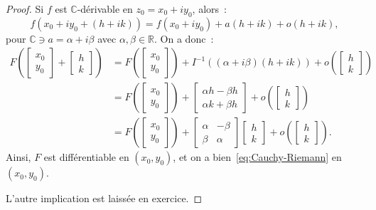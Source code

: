 \documentclass{report}
\theoremstyle{definition}
\theoremstyle{remark}
\numberwithin{equation}{section}
\newcommand{\C}{\mathbb C}
\newcommand{\R}{\mathbb R}
\begin{document}
			\begin{proof} Si $f$ est $\C$-dérivable en $z_0 = x_0 + iy_0$, alors~:
			\begin{equation}
				f(x_0 + iy_0 + (h + ik)) = f(x_0 + iy_0) + a(h+ik) + o(h+ik),
			\end{equation}
			pour $\C \ni a = \alpha + i\beta$ avec $\alpha, \beta \in \R$. On a donc~:
			\begin{align}
				F\left(\begin{bmatrix}x_0 \\ y_0\end{bmatrix} + \begin{bmatrix}h \\ k\end{bmatrix}\right)
					&= F\left(\begin{bmatrix}x_0 \\ y_0\end{bmatrix}\right) + I^{-1}\left((\alpha + i\beta)(h+ik)\right) + o\left(\begin{bmatrix}h\\k\end{bmatrix}\right) \\
					&= F\left(\begin{bmatrix}x_0 \\ y_0\end{bmatrix}\right) + \begin{bmatrix}\alpha h - \beta h \\\alpha k + \beta h\end{bmatrix} + o\left(\begin{bmatrix}h \\ k\end{bmatrix}\right) \\
					&= F\left(\begin{bmatrix}x_0 \\ y_0\end{bmatrix}\right) + \begin{bmatrix}\alpha & -\beta \\\beta & \alpha\end{bmatrix}\begin{bmatrix}h \\ k\end{bmatrix} + o\left(\begin{bmatrix}h \\ k\end{bmatrix}\right).
			\end{align}
			Ainsi, $F$ est différentiable en $(x_0, y_0)$, et on a bien~\eqref{eq:Cauchy-Riemann} en $(x_0, y_0)$.

			L'autre implication est laissée en exercice.
			\end{proof}
\end{document}
